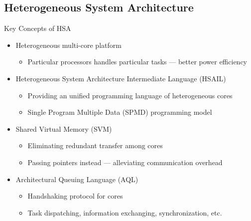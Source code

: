 \documentclass{beamer}
\begin{document}
\begin{CJK}{UTF8}{bkai}
    \subsection{Heterogeneous System Architecture}
    \begin{frame}{Key Concepts of HSA}
       \begin{itemize}
           \item Heterogeneous multi-core platform
               \begin{itemize}
                   \item Particular processors handles particular tasks --- better power efficiency
               \end{itemize}
           \item Heterogeneous System Architecture Intermediate Language (HSAIL)
               \begin{itemize}
                   \item Providing an unified programming language of heterogeneous cores
                   \item Single Program Multiple Data (SPMD) programming model
               \end{itemize}
           \item Shared Virtual Memory (SVM)
               \begin{itemize}
                   \item Eliminating redundant transfer among cores
                   \item Passing pointers instead --- alleviating communication overhead
               \end{itemize}
           \item Architectural Queuing Language (AQL)
               \begin{itemize}
                   \item Handshaking protocol for cores
                   \item Task dispatching, information exchanging, synchronization, etc.
               \end{itemize}
       \end{itemize} 
    \end{frame}


\end{CJK}
\end{document}
